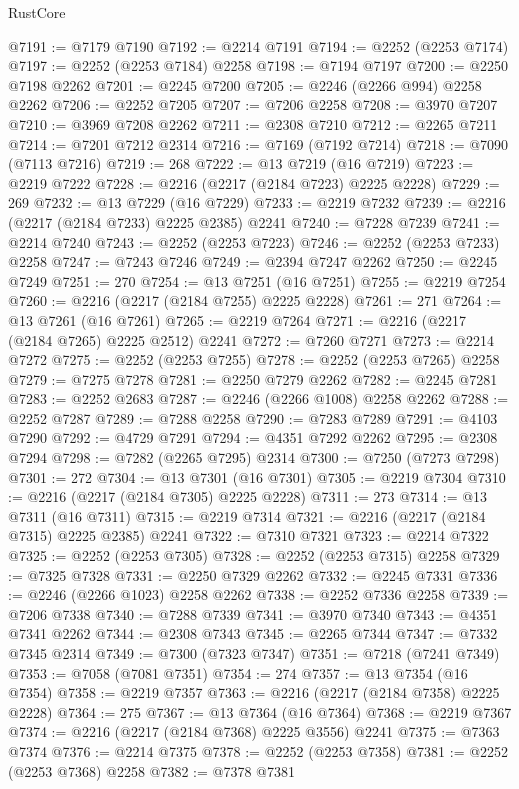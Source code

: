 \begin{lexlean}{RustCore}
\begin{coremodule}
@7191 := @7179 @7190
@7192 := @2214 @7191
@7194 := @2252 (@2253 @7174)
@7197 := @2252 (@2253 @7184) @2258
@7198 := @7194 @7197
@7200 := @2250 @7198 @2262
@7201 := @2245 @7200
@7205 := @2246 (@2266 @994) @2258 @2262
@7206 := @2252 @7205
@7207 := @7206 @2258
@7208 := @3970 @7207
@7210 := @3969 @7208 @2262
@7211 := @2308 @7210
@7212 := @2265 @7211
@7214 := @7201 @7212 @2314
@7216 := @7169 (@7192 @7214)
@7218 := @7090 (@7113 @7216)
@7219 := 268
@7222 := @13 @7219 (@16 @7219)
@7223 := @2219 @7222
@7228 := @2216 (@2217 (@2184 @7223) @2225 @2228)
@7229 := 269
@7232 := @13 @7229 (@16 @7229)
@7233 := @2219 @7232
@7239 := @2216 (@2217 (@2184 @7233) @2225 @2385) @2241
@7240 := @7228 @7239
@7241 := @2214 @7240
@7243 := @2252 (@2253 @7223)
@7246 := @2252 (@2253 @7233) @2258
@7247 := @7243 @7246
@7249 := @2394 @7247 @2262
@7250 := @2245 @7249
@7251 := 270
@7254 := @13 @7251 (@16 @7251)
@7255 := @2219 @7254
@7260 := @2216 (@2217 (@2184 @7255) @2225 @2228)
@7261 := 271
@7264 := @13 @7261 (@16 @7261)
@7265 := @2219 @7264
@7271 := @2216 (@2217 (@2184 @7265) @2225 @2512) @2241
@7272 := @7260 @7271
@7273 := @2214 @7272
@7275 := @2252 (@2253 @7255)
@7278 := @2252 (@2253 @7265) @2258
@7279 := @7275 @7278
@7281 := @2250 @7279 @2262
@7282 := @2245 @7281
@7283 := @2252 @2683
@7287 := @2246 (@2266 @1008) @2258 @2262
@7288 := @2252 @7287
@7289 := @7288 @2258
@7290 := @7283 @7289
@7291 := @4103 @7290
@7292 := @4729 @7291
@7294 := @4351 @7292 @2262
@7295 := @2308 @7294
@7298 := @7282 (@2265 @7295) @2314
@7300 := @7250 (@7273 @7298)
@7301 := 272
@7304 := @13 @7301 (@16 @7301)
@7305 := @2219 @7304
@7310 := @2216 (@2217 (@2184 @7305) @2225 @2228)
@7311 := 273
@7314 := @13 @7311 (@16 @7311)
@7315 := @2219 @7314
@7321 := @2216 (@2217 (@2184 @7315) @2225 @2385) @2241
@7322 := @7310 @7321
@7323 := @2214 @7322
@7325 := @2252 (@2253 @7305)
@7328 := @2252 (@2253 @7315) @2258
@7329 := @7325 @7328
@7331 := @2250 @7329 @2262
@7332 := @2245 @7331
@7336 := @2246 (@2266 @1023) @2258 @2262
@7338 := @2252 @7336 @2258
@7339 := @7206 @7338
@7340 := @7288 @7339
@7341 := @3970 @7340
@7343 := @4351 @7341 @2262
@7344 := @2308 @7343
@7345 := @2265 @7344
@7347 := @7332 @7345 @2314
@7349 := @7300 (@7323 @7347)
@7351 := @7218 (@7241 @7349)
@7353 := @7058 (@7081 @7351)
@7354 := 274
@7357 := @13 @7354 (@16 @7354)
@7358 := @2219 @7357
@7363 := @2216 (@2217 (@2184 @7358) @2225 @2228)
@7364 := 275
@7367 := @13 @7364 (@16 @7364)
@7368 := @2219 @7367
@7374 := @2216 (@2217 (@2184 @7368) @2225 @3556) @2241
@7375 := @7363 @7374
@7376 := @2214 @7375
@7378 := @2252 (@2253 @7358)
@7381 := @2252 (@2253 @7368) @2258
@7382 := @7378 @7381

\end{coremodule}
\end{lexlean}
